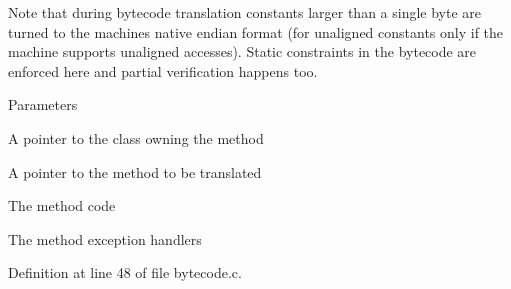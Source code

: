 Note that during bytecode translation constants larger than a single byte are turned to the machines native endian format (for unaligned constants only if the machine supports unaligned accesses). Static constraints in the bytecode are enforced here and partial verification happens too.


\begin{DoxyParams}{Parameters}
\item[{\em cl}]A pointer to the class owning the method \item[{\em method}]A pointer to the method to be translated \item[{\em code}]The method code \item[{\em handlers}]The method exception handlers \end{DoxyParams}


Definition at line 48 of file bytecode.c.



